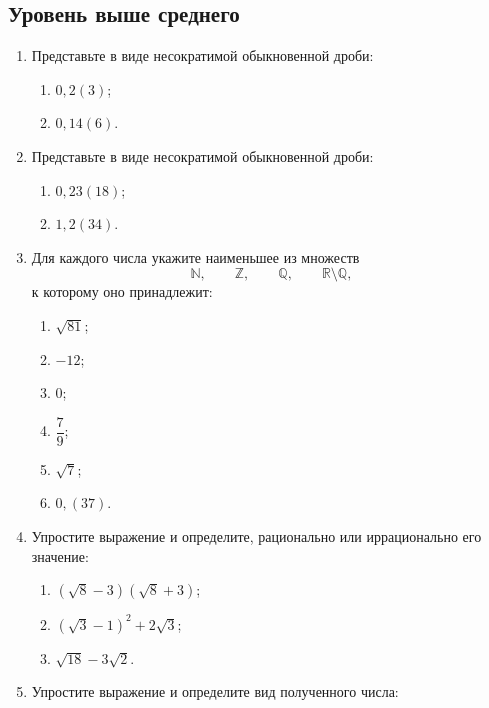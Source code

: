\documentclass[a4paper,12pt]{article}
\newcommand{\N}{\mathbb{N}}
\newcommand{\Z}{\mathbb{Z}}
\newcommand{\Q}{\mathbb{Q}}
\newcommand{\R}{\mathbb{R}}
\begin{document}
\subsection*{\textcolor{darkaccent}{Уровень выше среднего}}

\begin{enumerate}[start=4]

\item
Представьте в виде несократимой обыкновенной дроби:

\begin{enumerate}[label=\arabic*)]
    \item \(0{,}2(3)\);
    \item \(0{,}14(6)\).
\end{enumerate}

\item
Представьте в виде несократимой обыкновенной дроби:

\begin{enumerate}[label=\arabic*)]
    \item \(0{,}23(18)\);
    \item \(1{,}2(34)\).
\end{enumerate}

\item
Для каждого числа укажите наименьшее из множеств
\[
\N,\qquad \Z,\qquad \Q,\qquad \R\setminus\Q,
\]
к которому оно принадлежит:

\begin{enumerate}[label=\arabic*)]
    \item \(\sqrt{81}\);
    \item \(-12\);
    \item \(0\);
    \item \(\dfrac79\);
    \item \(\sqrt7\);
    \item \(0{,}(37)\).
\end{enumerate}

\item
Упростите выражение и определите, рационально или иррационально
его значение:

\begin{enumerate}[label=\arabic*)]
    \item \((\sqrt8-3)(\sqrt8+3)\);
    \item \((\sqrt3-1)^2+2\sqrt3\);
    \item \(\sqrt{18}-3\sqrt2\).
\end{enumerate}

\item
Упростите выражение и определите вид полученного числа:


\end{enumerate}
\end{document}
